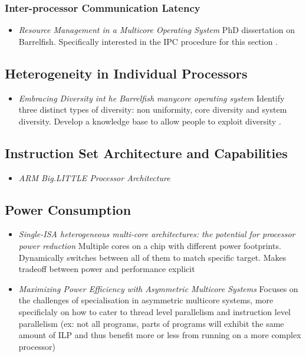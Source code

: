 \subsubsection{Inter-processor Communication Latency}
\begin{itemize}
\item \emph{Resource Management in a Multicore Operating System} PhD dissertation
on Barrelfish. Specifically interested in the IPC procedure for this section \cite{10.1109/MM.2011.1}.

\end{itemize}
\subsection{Heterogeneity in Individual Processors}
\begin{itemize}
\item \emph{Embracing Diversity int he Barrelfish manycore operating system}
Identify three distinct types of diversity: non uniformity, core diversity and 
system diversity. Develop a knowledge base to allow people to exploit
diversity \cite{Schuepbach08embracingdiversity}.
\end{itemize}
\subsection{Instruction Set Architecture and Capabilities}
\begin{itemize}
\item \emph{ARM Big.LITTLE Processor Architecture} \cite{ABL}
\end{itemize}

\subsection{Power Consumption}
\begin{itemize}
\item \emph{Single-ISA heterogeneous multi-core architectures: the potential 
for processor power reduction}  Multiple cores on a chip with different power
footprints. Dynamically switches between all of them to match specific target.
Makes tradeoff between power and performance explicit \cite{KFJRT:03}
\item \emph {Maximizing Power Efficiency with Asymmetric Multicore Systems
} Focuses on the challenges of specialisation in asymmetric multicore systems,
more specificlaly on how to cater to thread level parallelism and instruction level
parallelism (ex: not all programs, parts of programs will exhibit the same
amount of ILP and thus benefit more or less from running on a more complex
processor) \cite{FSSP:09}
\end{itemize}
